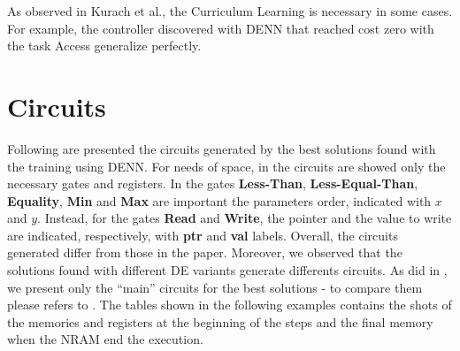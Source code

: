 As observed in Kurach et al., the Curriculum Learning is necessary in some cases. For example, the controller discovered with DENN that reached cost zero with the task Access generalize perfectly. 


\section{Circuits}\label{subsec:circuits}
Following are presented the circuits generated by the best solutions found with  the training using DENN. For needs of space, in the circuits are showed only the necessary gates and registers. In the gates \textbf{Less-Than}, \textbf{Less-Equal-Than}, \textbf{Equality}, \textbf{Min} and \textbf{Max} are important the parameters order, indicated with $x$ and $y$. Instead, for the gates \textbf{Read} and \textbf{Write}, the pointer and the value to write are indicated, respectively, with \textbf{ptr} and \textbf{val} labels.\newline\newline
Overall, the circuits generated differ from those in the paper. Moreover, we observed that the solutions found with different DE variants generate differents circuits. As did in \cite{NRAM:2016}, we present only the ``main'' circuits for the best solutions - to compare them please refers to \cite{NRAM:2016}. The tables shown in the following examples contains the shots of the memories and registers at the beginning of the steps and the final memory when the NRAM end the execution.
\clearpage
